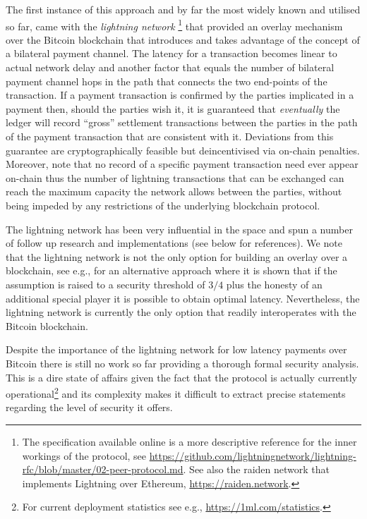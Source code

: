 The first instance of this approach and by far the most widely known and
utilised so far, 
came with the {\em lightning network } 
\cite{lightning}\footnote{The specification available online is a more descriptive reference for the inner workings of the protocol, see \url{https://github.com/lightningnetwork/lightning-rfc/blob/master/02-peer-protocol.md}. See also the raiden network that implements Lightning over Ethereum, \url{https://raiden.network}.} that provided an overlay mechanism over the Bitcoin blockchain that introduces and takes advantage of the concept of a bilateral payment channel. The latency for a transaction becomes linear to actual network delay and another factor that equals the number of bilateral payment channel hops in the path that  connects the two end-points of the transaction. If a payment  transaction is confirmed by the parties implicated in a payment then, should the parties wish it,  it is guaranteed that {\em eventually} the ledger will record ``gross'' settlement transactions between the parties in the path of the payment transaction that are consistent with it. Deviations from this guarantee are cryptographically feasible but deincentivised via on-chain penalties.   
Moreover, note that no record of a  specific payment transaction need ever appear on-chain 
thus the number of lightning transactions that can be  exchanged can reach the maximum capacity the network allows between the parties, without being impeded by any  restrictions of the underlying blockchain protocol. 

The lightning network has been very influential in the space and spun a number of follow up research and implementations (see below for references).
We note that the lightning network is not the only option for building an overlay over a blockchain, see e.g.,  \cite{DBLP:conf/eurocrypt/PassS18} for an alternative approach where it is shown that if the assumption is raised to a security threshold of $3/4$ plus the honesty of an additional special player it is possible to obtain optimal latency. Nevertheless, the lightning network is currently the only option that readily interoperates with the Bitcoin blockchain. 

Despite the importance of the lightning network for low latency payments over Bitcoin there is still no work so far providing a thorough formal security analysis. 
This is a dire state of affairs given the fact that the protocol is actually currently operational\footnote{For current deployment statistics see e.g.,  \url{https://1ml.com/statistics}.}
and its complexity makes it difficult to extract precise statements regarding the level of security it offers. 

